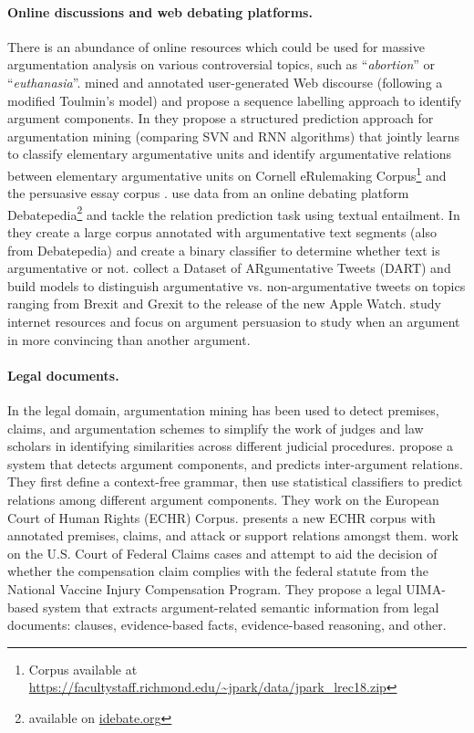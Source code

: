\paragraph{Online discussions and web debating platforms.}
There is an abundance of online resources which could be used for
massive argumentation analysis on various controversial topics, such as 
``\emph{abortion}'' or ``\emph{euthanasia}''.
\citet{habernal2017argumentation} mined and annotated user-generated
Web discourse (following a modified Toulmin's model) and propose 
a sequence labelling approach to identify argument components. 
In \citep{niculae2017argument} they propose a structured prediction approach 
for argumentation mining (comparing SVN and RNN algorithms) that jointly
learns to classify elementary argumentative units and identify argumentative relations
between elementary argumentative units on Cornell eRulemaking Corpus\footnote{Corpus 
available at \url{https://facultystaff.richmond.edu/~jpark/data/jpark_lrec18.zip}}
and the persuasive essay corpus \citep{stab2017parsing}.
\citet{cabrio2012combining} use data from an online debating platform
Debatepedia\footnote{available on \url{idebate.org}} and tackle the relation 
prediction task using textual entailment. 
In \citep{al2016cross} they create a large corpus annotated with argumentative
text segments (also from Debatepedia) and create a binary classifier to determine
whether text is argumentative or not. \citet{dusmanu2017argument} collect 
a Dataset of ARgumentative Tweets (DART) and build models to distinguish argumentative
vs. non-argumentative tweets on topics ranging from Brexit and Grexit to 
the release of the new Apple Watch. 
\citet{habernal2016argument} study internet resources and 
focus on argument persuasion to study when
an argument in more convincing than another argument. 

\paragraph{Legal documents. } 
In the legal domain, argumentation mining has been used to detect
premises, claims, and argumentation schemes to simplify
the work of judges and law scholars in identifying similarities 
across different judicial procedures. 
\citet{palau2009argumentation} propose a system that detects argument components, 
and predicts inter-argument relations. They first define a context-free
grammar, then use statistical classifiers to predict relations among different 
argument components. They work on the European Court of Human Rights (ECHR) Corpus.
\citet{teruel2018increasing} presents a new ECHR corpus with annotated 
premises, claims, and attack or support relations amongst them.
\citet{grabmair2015introducing} work on the U.S. Court of Federal Claims
cases and attempt to aid the decision of whether the compensation claim
complies with the federal statute from the National Vaccine Injury Compensation
Program. They propose a legal UIMA-based \citep{ferrucci2004uima} system 
that extracts argument-related semantic information from legal documents: clauses,
evidence-based facts, evidence-based reasoning, and other. 

